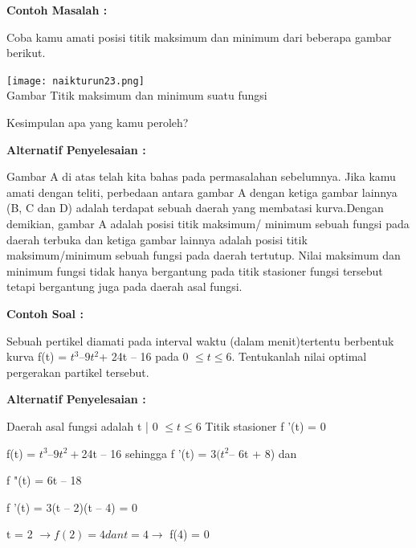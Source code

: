 \documentclass[11pt,fleqn]{book} %
\begin{document}
\begin{flushleft}
\textbf{Contoh Masalah :}

Coba kamu amati posisi titik maksimum dan minimum
dari beberapa gambar berikut.
\end{flushleft}

\begin{center}
\texttt{[image: naikturun23.png]}\\
Gambar Titik maksimum dan minimum suatu fungsi
\end{center}

\begin{flushleft}
Kesimpulan apa yang kamu peroleh?
\end{flushleft}

\begin{flushleft}
\textbf{Alternatif Penyelesaian :}
\end{flushleft}

Gambar A di atas telah kita bahas pada permasalahan
sebelumnya. Jika kamu amati dengan teliti, perbedaan antara gambar A dengan ketiga gambar lainnya (B, C dan D) adalah terdapat sebuah daerah yang membatasi kurva.Dengan demikian, gambar A adalah posisi titik maksimum/ minimum sebuah fungsi pada daerah terbuka dan ketiga gambar lainnya adalah posisi titik maksimum/minimum sebuah fungsi pada daerah tertutup. Nilai maksimum dan minimum fungsi tidak hanya bergantung pada titik stasioner fungsi tersebut tetapi bergantung juga pada daerah asal fungsi.


\begin{flushleft}
\textbf{Contoh Soal :}
\end{flushleft}

Sebuah pertikel diamati pada interval waktu (dalam menit)tertentu berbentuk kurva f(t) = $t^{3} – 9t^{2} $+ 24t – 16 pada 0 $\leq t \leq 6.$ Tentukanlah nilai optimal pergerakan partikel tersebut.

\begin{flushleft}
\textbf{Alternatif Penyelesaian :}
\end{flushleft}

Daerah asal fungsi adalah {t | 0 $\leq t \leq $6} Titik stasioner
f '(t) = 0

f(t) = $t^{3} – 9t^{2} + $24t – 16 sehingga f '(t) = 3$(t^{2} $– 6t + 8) dan

f "(t) = 6t – 18

f '(t) = 3(t – 2)(t – 4) = 0

t = 2 $\rightarrow f (2) = 4 dan t = 4 \rightarrow$ f(4) = 0
\end{document}
